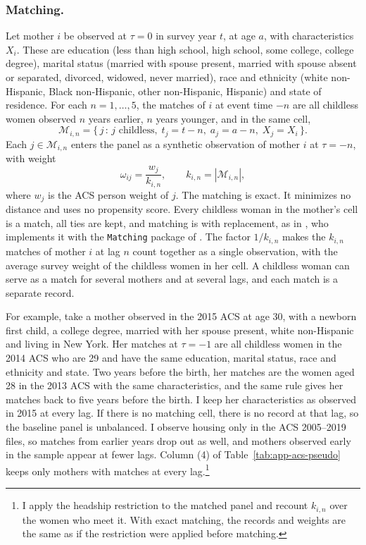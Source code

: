\subsubsection*{Matching.}
Let mother $i$ be observed at $\tau=0$ in survey year $t$, at age $a$, with
characteristics $X_i$. These are education (less than high school, high
school, some college, college degree), marital status (married with spouse
present, married with spouse absent or separated, divorced, widowed, never
married), race and ethnicity (white non-Hispanic, Black non-Hispanic, other
non-Hispanic, Hispanic) and state of residence. For each $n = 1,\dots,5$, the
matches of $i$ at event time $-n$ are all childless women observed $n$ years
earlier, $n$ years younger, and in the same cell,
\begin{equation}
\mathcal{M}_{i,n} = \bigl\{\, j \,:\, \text{$j$ childless},\;
t_j = t - n,\; a_j = a - n,\; X_j = X_i \,\bigr\}.
\end{equation}
Each $j \in \mathcal{M}_{i,n}$ enters the panel as a synthetic observation of
mother $i$ at $\tau = -n$, with weight
\begin{equation}
\omega_{ij} = \frac{w_j}{k_{i,n}}, \qquad k_{i,n} = \left| \mathcal{M}_{i,n} \right|,
\end{equation}
where $w_j$ is the ACS person weight of $j$. The matching is exact. It
minimizes no distance and uses no propensity score. Every childless woman in
the mother's cell is a match, all ties are kept, and matching is with
replacement, as in \citet{klevenGeographyChildPenalties2025}, who implements
it with the \texttt{Matching} package of \citet{sekhonMatching2011}. The
factor $1/k_{i,n}$ makes the $k_{i,n}$ matches of mother $i$ at lag $n$ count
together as a single observation, with the average survey weight of the
childless women in her cell. A childless woman can serve as a match for
several mothers and at several lags, and each match is a separate record.

For example, take a mother observed in the 2015 ACS at age 30, with a
newborn first child, a college degree, married with her spouse present, white
non-Hispanic and living in New York. Her matches at $\tau=-1$ are all
childless women in the 2014 ACS who are 29 and have the same education,
marital status, race and ethnicity and state. Two years before the birth, her matches are the women aged 28 in the 2013
ACS with the same characteristics, and the same rule gives her matches back
to five years before the birth. I keep her characteristics as observed in
2015 at every lag. If there is no matching cell, there is no record at that lag, so the
baseline panel is unbalanced. I observe housing only in the ACS 2005--2019
files, so matches from earlier years drop out as well, and mothers observed
early in the sample appear at fewer lags. Column (4) of
Table~\ref{tab:app-acs-pseudo} keeps only mothers with matches at every lag.\footnote{I apply the headship restriction to the
matched panel and recount $k_{i,n}$ over the women who meet it. With exact
matching, the records and weights are the same as if the restriction were
applied before matching.}

